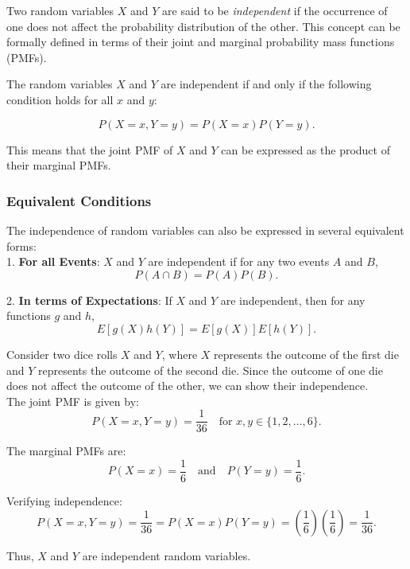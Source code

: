 Two random variables \( X \) and \( Y \) are said to be \textit{independent} if the occurrence of one does not affect the probability distribution of the other. This concept can be formally defined in terms of their joint and marginal probability mass functions (PMFs).

\begin{definition}
    The random variables \( X \) and \( Y \) are independent if and only if the following condition holds for all \( x \) and \( y \):

\[
P(X = x, Y = y) = P(X = x) P(Y = y).
\]

\end{definition}

This means that the joint PMF of \( X \) and \( Y \) can be expressed as the product of their marginal PMFs.

\subsubsection{Equivalent Conditions}

The independence of random variables can also be expressed in several equivalent forms:\\

1. \textbf{For all Events}: \( X \) and \( Y \) are independent if for any two events \( A \) and \( B \),
   \[
   P(A \cap B) = P(A) P(B).
   \]

2. \textbf{In terms of Expectations}: If \( X \) and \( Y \) are independent, then for any functions \( g \) and \( h \),
   \[
   E[g(X) h(Y)] = E[g(X)] E[h(Y)].
   \]

\begin{example}
    Consider two dice rolls \( X \) and \( Y \), where \( X \) represents the outcome of the first die and \( Y \) represents the outcome of the second die. Since the outcome of one die does not affect the outcome of the other, we can show their independence.\\

The joint PMF is given by:
\[
P(X = x, Y = y) = \frac{1}{36} \quad \text{for } x, y \in \{1, 2, \ldots, 6\}.
\]

The marginal PMFs are:
\[
P(X = x) = \frac{1}{6} \quad \text{and} \quad P(Y = y) = \frac{1}{6}.
\]

Verifying independence:
\[
P(X = x, Y = y) = \frac{1}{36} = P(X = x) P(Y = y) = \left(\frac{1}{6}\right)\left(\frac{1}{6}\right) = \frac{1}{36}.
\]

Thus, \( X \) and \( Y \) are independent random variables.
\end{example}

